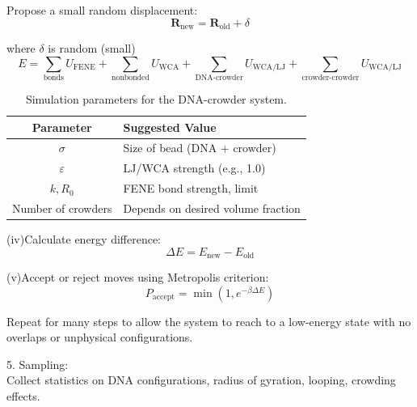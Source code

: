 \documentclass[12pt]{article}
\begin{document}
\begin{flushleft}
Propose a small random displacement:
\begin{equation}
\mathbf{R}_{\text{new}} = \mathbf{R}_{\text{old}} + \delta
\end{equation}

\setlength{\parindent}{95pt}where \(\delta\) is random (small)
\begin{equation}
E = \sum_{\text{bonds}} U_{\mathrm{FENE}} + \sum_{\text{nonbonded}} U_{\mathrm{WCA}} 
+ \sum_{\text{DNA-crowder}} U_{\mathrm{WCA/LJ}} 
+ \sum_{\text{crowder-crowder}} U_{\mathrm{WCA/LJ}}
\end{equation}

\begin{table}[htbp]
\centering
\begin{tabular}{|c|l|}
\hline
\textbf{Parameter} & \textbf{Suggested Value} \\
\hline
$\sigma$ & Size of bead (DNA + crowder) \\
\hline
$\varepsilon$ & LJ/WCA strength (e.g., 1.0) \\
\hline
$k, R_0$ & FENE bond strength, limit \\
\hline
Number of crowders & Depends on desired volume fraction \\
\hline
\end{tabular}
\caption{Simulation parameters for the DNA-crowder system.}
\end{table}


\setlength{\parindent}{0em}
\setlength{\parindent}{6em}

(iv)Calculate energy difference:
\begin{equation}
\Delta E = E_{\text{new}} - E_{\text{old}}
\end{equation}




(v)Accept or reject moves using Metropolis criterion:
\begin{equation}
P_{\text{accept}} = \min \left(1, e^{-\beta \Delta E}\right)
\end{equation}

\setlength{\parindent}{0em}

\setlength{\parindent}{4em}
Repeat for many steps to allow the system to reach to a low-energy state with no overlaps or unphysical configurations.


\setlength{\parindent}{0em}

5. Sampling:\\
Collect statistics on DNA configurations, radius of gyration, looping, crowding effects.\\









\end{flushleft}
\end{document}
